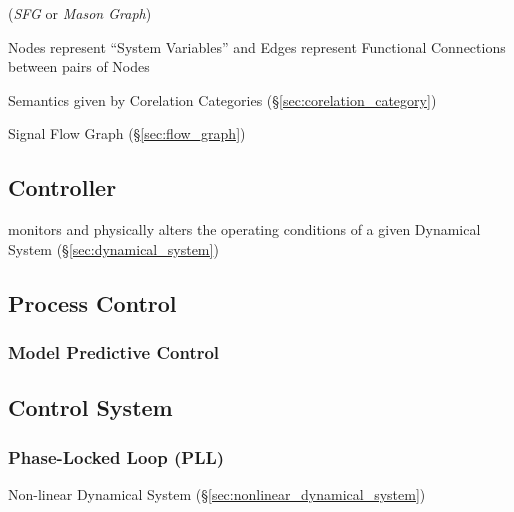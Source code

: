 (\emph{SFG} or \emph{Mason Graph})

Nodes represent ``System Variables'' and Edges represent Functional
Connections between pairs of Nodes


Semantics given by Corelation Categories
(\S\ref{sec:corelation_category})

Signal Flow Graph (\S\ref{sec:flow_graph})



\subsection{Controller}\label{sec:controller}


monitors and physically alters the operating conditions of a given
Dynamical System (\S\ref{sec:dynamical_system})



\subsection{Process Control}\label{sec:process_control}

\subsubsection{Model Predictive Control}\label{sec:model_predictive_control}



\subsection{Control System}\label{sec:control_system}

\subsubsection{Phase-Locked Loop (PLL)}\label{sec:pll}

Non-linear Dynamical System (\S\ref{sec:nonlinear_dynamical_system})



